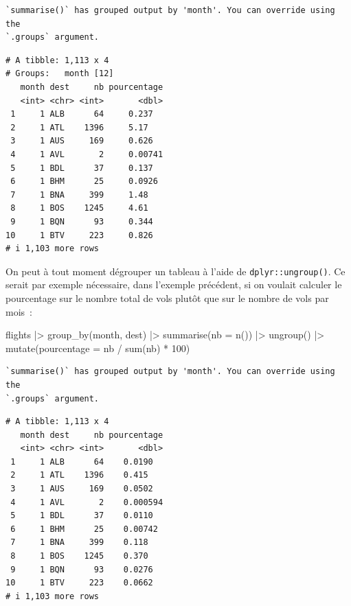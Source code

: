 \documentclass[
  letterpaper,
  DIV=11,
  numbers=noendperiod,
  oneside]{scrreprt}
\newenvironment{Shaded}{\begin{snugshade}}{\end{snugshade}}
\newcommand{\AttributeTok}[1]{\textcolor[rgb]{0.40,0.45,0.13}{#1}}
\newcommand{\DecValTok}[1]{\textcolor[rgb]{0.68,0.00,0.00}{#1}}
\newcommand{\FunctionTok}[1]{\textcolor[rgb]{0.28,0.35,0.67}{#1}}
\newcommand{\NormalTok}[1]{\textcolor[rgb]{0.00,0.23,0.31}{#1}}
\newcommand{\SpecialCharTok}[1]{\textcolor[rgb]{0.37,0.37,0.37}{#1}}
\begin{document}
\begin{verbatim}
`summarise()` has grouped output by 'month'. You can override using the
`.groups` argument.
\end{verbatim}

\begin{verbatim}
# A tibble: 1,113 x 4
# Groups:   month [12]
   month dest     nb pourcentage
   <int> <chr> <int>       <dbl>
 1     1 ALB      64     0.237  
 2     1 ATL    1396     5.17   
 3     1 AUS     169     0.626  
 4     1 AVL       2     0.00741
 5     1 BDL      37     0.137  
 6     1 BHM      25     0.0926 
 7     1 BNA     399     1.48   
 8     1 BOS    1245     4.61   
 9     1 BQN      93     0.344  
10     1 BTV     223     0.826  
# i 1,103 more rows
\end{verbatim}

On peut à tout moment dégrouper un tableau à l'aide de
\texttt{dplyr::ungroup()}. Ce serait par exemple nécessaire, dans
l'exemple précédent, si on voulait calculer le pourcentage sur le nombre
total de vols plutôt que sur le nombre de vols par mois~:

\begin{Shaded}
\begin{Highlighting}[]
\NormalTok{flights }\SpecialCharTok{|\textgreater{}}
  \FunctionTok{group\_by}\NormalTok{(month, dest) }\SpecialCharTok{|\textgreater{}}
  \FunctionTok{summarise}\NormalTok{(}\AttributeTok{nb =} \FunctionTok{n}\NormalTok{()) }\SpecialCharTok{|\textgreater{}} 
  \FunctionTok{ungroup}\NormalTok{() }\SpecialCharTok{|\textgreater{}} 
  \FunctionTok{mutate}\NormalTok{(}\AttributeTok{pourcentage =}\NormalTok{ nb }\SpecialCharTok{/} \FunctionTok{sum}\NormalTok{(nb) }\SpecialCharTok{*} \DecValTok{100}\NormalTok{)}
\end{Highlighting}
\end{Shaded}

\begin{verbatim}
`summarise()` has grouped output by 'month'. You can override using the
`.groups` argument.
\end{verbatim}

\begin{verbatim}
# A tibble: 1,113 x 4
   month dest     nb pourcentage
   <int> <chr> <int>       <dbl>
 1     1 ALB      64    0.0190  
 2     1 ATL    1396    0.415   
 3     1 AUS     169    0.0502  
 4     1 AVL       2    0.000594
 5     1 BDL      37    0.0110  
 6     1 BHM      25    0.00742 
 7     1 BNA     399    0.118   
 8     1 BOS    1245    0.370   
 9     1 BQN      93    0.0276  
10     1 BTV     223    0.0662  
# i 1,103 more rows
\end{verbatim}
\end{document}
